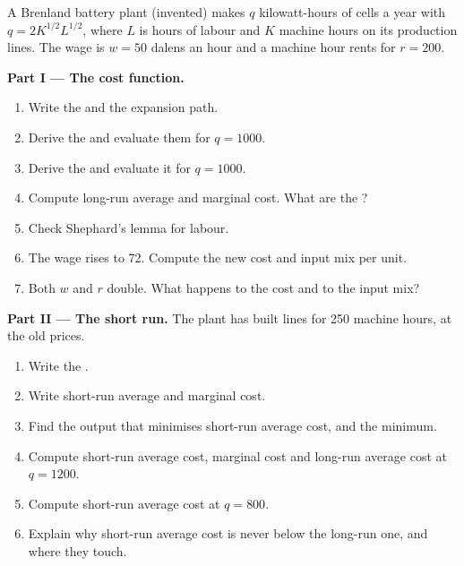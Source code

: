 \begin{problem}\label{pb:b1:cost-minimisation:battery}
A Brenland battery plant (invented) makes $q$ kilowatt-hours of cells a year
with $q = 2K^{1/2}L^{1/2}$, where $L$ is hours of labour and $K$ machine hours on its
production lines. The wage is $w = 50$ dalens an hour and a machine hour rents
for $r = 200$.

\medskip\noindent\textbf{Part I --- The cost function.}
\begin{enumerate}
  \item Write the  and the expansion path.
  \item Derive the  and evaluate them for $q = 1000$.
  \item Derive the  and evaluate it for $q = 1000$.
  \item Compute long-run average and marginal cost. What are the ?
  \item Check Shephard's lemma for labour.
  \item The wage rises to 72. Compute the new cost and input mix per unit.
  \item Both $w$ and $r$ double. What happens to the cost and to the input mix?
\end{enumerate}

\medskip\noindent\textbf{Part II --- The short run.} The plant has built lines for
250 machine hours, at the old prices.
\begin{enumerate}[resume]
  \item Write the .
  \item Write short-run average and marginal cost.
  \item Find the output that minimises short-run average cost, and the minimum.
  \item Compute short-run average cost, marginal cost and long-run average cost at $q = 1200$.
  \item Compute short-run average cost at $q = 800$.
  \item Explain why short-run average cost is never below the long-run one, and where they touch.
\end{enumerate}


\end{problem}
